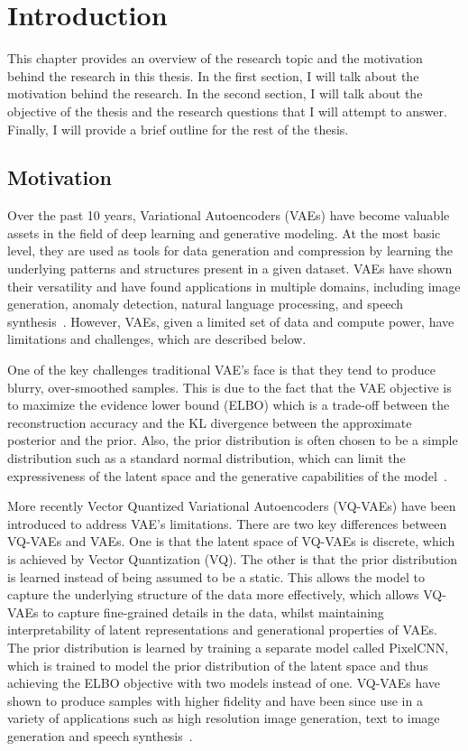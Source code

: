 \chapter{Introduction}

This chapter provides an overview of the research topic and the motivation behind the research in this thesis. In the first section, I will talk about the motivation behind the research. In the second section, I will talk about the objective of the thesis and the research questions that I will attempt to answer. Finally, I will provide a brief outline for the rest of the thesis.

\section{Motivation}

Over the past 10 years, Variational Autoencoders (VAEs) have become valuable assets in the field of deep learning and generative modeling. At the most basic level, they are used as tools for data generation and compression by learning the underlying patterns and structures present in a given dataset. VAEs have shown their versatility and have found applications in multiple domains, including image generation, anomaly detection, natural language processing, and speech synthesis~\cite{kingma2013autoencoding,Kingma_2019, vqvae, dalle}. However, VAEs, given a limited set of data and compute power, have limitations and challenges, which are described below.

One of the key challenges traditional VAE's face is that they tend to produce blurry, over-smoothed samples. This is due to the fact that the VAE objective is to maximize the evidence lower bound (ELBO) which is a trade-off between the reconstruction accuracy and the KL divergence between the approximate posterior and the prior. Also, the prior distribution is often chosen to be a simple distribution such as a standard normal distribution, which can limit the expressiveness of the latent space and the generative capabilities of the model~\cite{Kingma_2019}.

More recently Vector Quantized Variational Autoencoders (VQ-VAEs) have been introduced to address VAE's limitations. There are two key differences between VQ-VAEs and VAEs. One is that the latent space of VQ-VAEs is discrete, which is achieved by Vector Quantization (VQ). The other is that the prior distribution is learned instead of being assumed to be a static. This allows the model to capture the underlying structure of the data more effectively, which allows VQ-VAEs to capture fine-grained details in the data, whilst maintaining interpretability of latent representations and generational properties of VAEs. The prior distribution is learned by training a separate model called PixelCNN, which is trained to model the prior distribution of the latent space and thus achieving the ELBO objective with two models instead of one. VQ-VAEs have shown to produce samples with higher fidelity and have been since use in a variety of applications such as high resolution image generation, text to image generation and speech synthesis~\cite{vqvae,vqvae2, dalle}.

